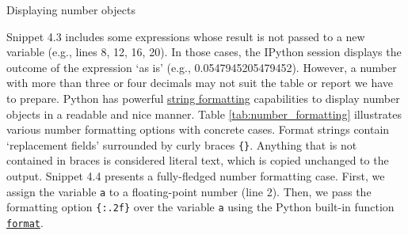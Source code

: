 \documentclass[a4paper,11pt]{book}
\numberwithin{figure}{chapter}
\numberwithin{table}{chapter}
\newcommand{\question}[1]{%
    \begin{tcolorbox}[colback=comp_c!10,colframe=comp_c,sidebyside align=top,width=\linewidth,before skip=1ex]
        #1
    \end{tcolorbox}%
    \switchcolumn%
}
\newcommand{\note}[1]{%
    \begin{tcolorbox}[colback=white!0,colframe=white!10,width=\linewidth,before skip=1ex]
        #1
    \end{tcolorbox}         
}
\begin{document}
\begin{paracol}{2}
	\question{\raggedright Displaying number objects}
	\note{Snippet 4.3 includes some expressions whose result is not passed to a new variable (e.g., lines 8, 12, 16, 20). In those cases, the IPython session displays the outcome of the expression `as is' (e.g., 0.0547945205479452). However, a number with more than three or four decimals may not suit the table or report we have to prepare. Python has powerful \href{https://docs.python.org/3/library/string.html}{string formatting} capabilities to display number objects in a readable and nice manner. Table \ref{tab:number_formatting} illustrates various number formatting options with concrete cases. Format strings contain `replacement fields' surrounded by curly braces \texttt{\{\}}. Anything that is not contained in braces is considered literal text, which is copied unchanged to the output. Snippet 4.4 presents a fully-fledged number formatting case. First, we assign the variable \texttt{a} to a floating-point number (line 2). Then, we pass the formatting option \texttt{\{:.2f\}} over the variable \texttt{a} using the Python built-in function \href{https://docs.python.org/3/library/stdtypes.html#str.format}{\texttt{format}}.}
\end{paracol}
\clearpage
\end{document}

